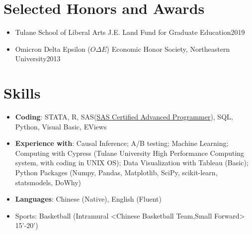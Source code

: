 \documentclass{resume}
\begin{document}

\section{Selected Honors and Awards}
\begin{itemize}[parsep=0.25ex]
  \item Tulane School of Liberal Arts J.E. Land Fund for Graduate Education\hfill 2019
  \item Omicron Delta Epsilon ($O\Delta E$) Economic Honor Society, Northeastern University\hfill 2013
\end{itemize}

\section{Skills}
\begin{itemize}[parsep=0.25ex]
  \item \textbf{Coding}:
    STATA, R, SAS(\href{https://www.youracclaim.com/badges/c4bce10e-7398-4203-9d11-f9c6723749a4/linked_in_profile}{SAS Certified Advanced Programmer}), SQL, Python, Visual Basic, EViews
    

  \item \textbf{Experience with}:
   Causal Inference; A/B testing; Machine Learning; Computing with Cypress (Tulane University High Performance Computing system, with coding in UNIX OS); Data Visualization with Tableau (Basic); Python Packages (Numpy, Pandas, Matplotlib, SciPy, scikit-learn, statsmodels, DoWhy)


 \item \textbf{Languages}: 
  Chinese (Native), English (Fluent)  
  
  \item Sports: 
  Basketball (Intramural <Chinese Basketball Team,Small Forward> 15'-20')
\end{itemize}
\end{document}
